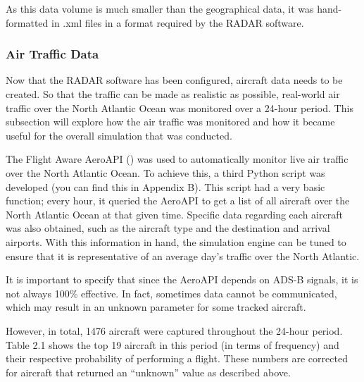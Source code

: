 \documentclass[stu, a4paper, 12pt, floatsintext]{apa7}
\numberwithin{figure}{section}
\numberwithin{table}{section}
\numberwithin{equation}{section}
\begin{document}
As this data volume is much smaller than the geographical data, it was hand-formatted in .xml files in a format required by the RADAR software. 

\subsubsection{Air Traffic Data}
Now that the RADAR software has been configured, aircraft data needs to be created. So that the traffic can be made as realistic as possible, real-world air traffic over the North Atlantic Ocean was monitored over a 24-hour period. This subsection will explore how the air traffic was monitored and how it became useful for the overall simulation that was conducted.

The Flight Aware AeroAPI (\cite{FlightAwareAeroAPI}) was used to automatically monitor live air traffic over the North Atlantic Ocean. To achieve this, a third Python script was developed (you can find this in Appendix B). This script had a very basic function; every hour, it queried the AeroAPI to get a list of all aircraft over the North Atlantic Ocean at that given time. Specific data regarding each aircraft was also obtained, such as the aircraft type and the destination and arrival airports. With this information in hand, the simulation engine can be tuned to ensure that it is representative of an average day’s traffic over the North Atlantic. 

It is important to specify that since the AeroAPI depends on ADS-B signals, it is not always 100\% effective. In fact, sometimes data cannot be communicated, which may result in an unknown parameter for some tracked aircraft. 

However, in total, 1476 aircraft were captured throughout the 24-hour period. Table 2.1 shows the top 19 aircraft in this period (in terms of frequency) and their respective probability of performing a flight. These numbers are corrected for aircraft that returned an “unknown” value as described above.
\end{document}
